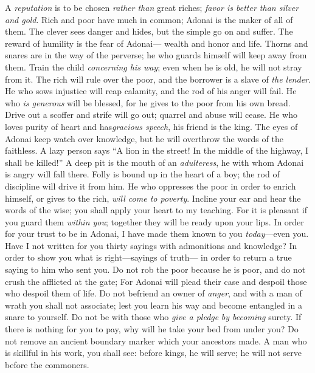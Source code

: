 \begin{biblechapter} %
\verse A \textit{reputation} is to be chosen \textit{rather than} great riches; 
\textit{favor is better than silver and gold}.
\verse Rich and poor have much in common; 
Adonai is the maker of all of them.
\verse The clever sees danger and hides, 
but the simple go on and suffer.
\verse The reward of humility is the fear of Adonai— 
wealth and honor and life.
\verse Thorns and snares are in the way of the perverse; 
he who guards himself will keep away from them.
\verse Train the child \textit{concerning his way}; 
even when he is old, he will not stray from it.
\verse The rich will rule over the poor, 
and the borrower is a slave of \textit{the lender}.
\verse He who sows injustice will reap calamity, 
and the rod of his anger will fail.
\verse He who \textit{is generous} will be blessed, 
for he gives to the poor from his own bread.
\verse Drive out a scoffer and strife will go out; 
quarrel and abuse will cease.
\verse He who loves purity of heart 
and has\textit{gracious speech}, his friend is the king.
\verse The eyes of Adonai keep watch over knowledge, 
but he will overthrow the words of the faithless.
\verse A lazy person says “A lion in the street! 
In the middle of the highway, I shall be killed!”
\verse A deep pit is the mouth of an \textit{adulteress}, 
he with whom Adonai is angry will fall there.
\verse Folly is bound up in the heart of a boy; 
the rod of discipline will drive it from him.
\verse He who oppresses the poor in order to enrich himself, 
or gives to the rich, \textit{will come to poverty}.
 Incline your ear and hear the words of the wise; 
you shall apply your heart to my teaching.
\verse For it is pleasant if you guard them \textit{within you}; 
together they will be ready upon your lips.
\verse In order for your trust to be in Adonai, 
I have made them known to you \textit{today}—even you.
\verse Have I not written for you thirty sayings 
with admonitions and knowledge?
\verse In order to show you what is right—sayings of truth— 
in order to return a true saying to him who sent you.
\verse Do not rob the poor because he is poor, 
and do not crush the afflicted at the gate;
\verse For Adonai will plead their case 
and despoil those who despoil them of life.
\verse Do not befriend an owner of \textit{anger}, 
and with a man of wrath you shall not associate;
\verse lest you learn his way 
and become entangled in a snare to yourself.
\verse Do not be with those who \textit{give a pledge} 
\textit{by becoming} surety.
\verse If there is nothing for you to pay, 
why will he take your bed from under you?
\verse Do not remove an ancient boundary marker 
which your ancestors made.
\verse A man who is skillful in his work, you shall see: 
before kings, he will serve; 
he will not serve before the commoners.
\end{biblechapter}

